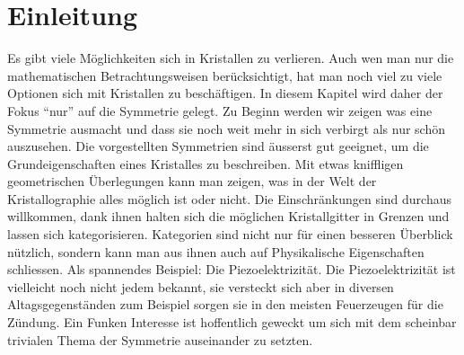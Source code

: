 \section{Einleitung}
Es gibt viele Möglichkeiten sich in Kristallen zu verlieren.
Auch wen man nur die mathematischen Betrachtungsweisen berücksichtigt, 
hat man noch viel zu viele Optionen sich mit Kristallen zu beschäftigen.
In diesem Kapitel wird daher der Fokus ``nur'' auf die Symmetrie gelegt.
Zu Beginn werden wir zeigen was eine Symmetrie ausmacht und 
dass sie noch weit mehr in sich verbirgt als nur schön auszusehen.
Die vorgestellten Symmetrien sind äusserst gut geeignet, 
um die Grundeigenschaften eines Kristalles zu beschreiben.
Mit etwas kniffligen geometrischen Überlegungen kann man zeigen, 
was in der Welt der Kristallographie alles möglich ist oder nicht.
Die Einschränkungen sind durchaus willkommen, 
dank ihnen halten sich die möglichen Kristallgitter in Grenzen 
und lassen sich kategorisieren.%
Kategorien sind nicht nur für einen besseren Überblick nützlich, 
sondern kann man aus ihnen auch auf Physikalische Eigenschaften schliessen. 
Als spannendes Beispiel: Die Piezoelektrizität.
Die Piezoelektrizität ist vielleicht noch nicht jedem bekannt, 
sie versteckt sich aber in diversen Altagsgegenständen 
zum Beispiel sorgen sie in den meisten Feuerzeugen für die Zündung.
Ein Funken Interesse ist hoffentlich geweckt 
um sich mit dem scheinbar trivialen Thema der Symmetrie auseinander zu setzten.



